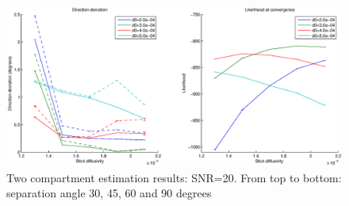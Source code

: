 \documentclass{article}
\begin{document}
\begin{enumerate}
\begin{figure}[H]
    \includegraphics[width=\textwidth]{figures/two_fiber__snr=20__angle=90.eps}
    \caption{\label{figTwoFibers1}Two compartment estimation results: SNR=20. From top to bottom: separation angle 30, 45, 60 and 90 degrees}
\end{figure}
  

\end{enumerate}
\end{document}
